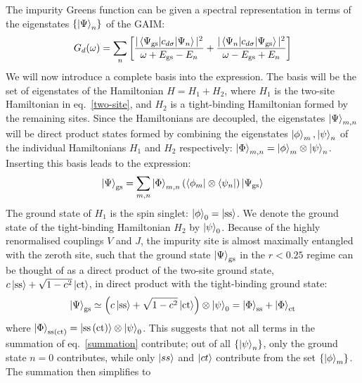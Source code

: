 \documentclass[reprint,superscriptaddress,floatfix]{revtex4-2}
\begin{document}
The impurity Greens function can be given a spectral representation in terms of the eigenstates \(\left\{\ket{\Psi}_n\right\}\) of the GAIM:
\begin{equation}\begin{aligned}
G_d(\omega) = \sum_n \left[ \frac{|\braket{\Psi_\text{gs} | c_{d\sigma} | \Psi_n}|^2}{\omega + E_\text{gs} - E_n} + \frac{|\braket{\Psi_n | c_{d\sigma} | \Psi_\text{gs}}|^2}{\omega - E_\text{gs} + E_n}\right] 
\end{aligned}\end{equation}
We will now introduce a complete basis into the expression. The basis will be the set of eigenstates of the Hamiltonian  \(H = H_1 + H_2\), where \(H_1\) is the two-site Hamiltonian in eq.~\ref{two-site}, and \(H_2\) is a tight-binding Hamiltonian formed by the remaining sites. Since the Hamiltonians are decoupled, the eigenstates \(\ket{\Psi}_{m,n}\) will be direct product states formed by combining the eigenstates \(\ket{\phi}_m,\ket{\psi}_n\) of the individual Hamiltonians \(H_1\) and \(H_2\) respectively: \(\ket{\Phi}_{m,n} = \ket{\phi}_m\otimes\ket{\psi}_n\). Inserting this basis leads to the expression:
\begin{equation}\begin{aligned}
	\label{summation}
	\ket{\Psi}_\text{gs} = \sum_{m,n} \ket{\Phi}_{m,n} \left(\bra{\phi_{m}}\otimes\bra{\psi_n}\right)\ket{\Psi_\text{gs}}
\end{aligned}\end{equation}
The ground state of \(H_1\) is the spin singlet: \(\ket{\phi}_0 = \ket{\text{ss}}\). We denote the ground state of the tight-binding Hamiltonian \(H_2\) by \(\ket{\psi}_0\). Because of the highly renormalised couplings \(V\) and \(J\), the impurity site is almost maximally entangled with the zeroth site, such that the ground state \(\ket{\Psi}_\text{gs}\) in the \(r < 0.25\) regime can be thought of as a direct product of the two-site ground state, \(c\ket{\text{ss}} + \sqrt{1-c^2}\ket{\text{ct}}\), in direct product with the tight-binding ground state:
\begin{equation}\begin{aligned}
	\ket{\Psi}_\text{gs} \simeq \left(c\ket{\text{ss}} + \sqrt{1-c^2}\ket{\text{ct}}\right)  \otimes \ket{\psi}_0 = \ket{\Phi}_\text{ss} + \ket{\Phi}_\text{ct}
\end{aligned}\end{equation}
where \(\ket{\Phi}_\text{ss(ct)} = \ket{\text{ss}\left( \text{ct} \right)}\otimes\ket{\psi}_0 \).
This suggests that not all terms in the summation of eq.~\ref{summation} contribute; out of all \(\left\{ \ket{\psi}_n \right\} \), only the ground state \(n=0\) contributes, while only \(\ket{ss}\) and \(\ket{ct}\) contribute from the set \(\left\{ \ket{\phi}_m \right\} \). The summation then simplifies to
\end{document}
